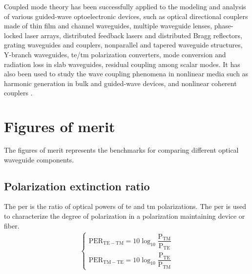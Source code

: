 \documentclass[../report.tex]{subfiles}
\begin{document}
\par 
Coupled mode theory has been successfully applied to the modeling and analysis of various guided-wave optoelectronic devices, such as optical directional couplers made of thin film and channel waveguides, multiple waveguide lenses, phase-locked laser arrays, distributed feedback lasers and distributed Bragg reflectors, grating waveguides and couplers, nonparallel and tapered waveguide structures, Y-branch waveguides, \gls{te}/\gls{tm} polarization converters, mode conversion and radiation loss in slab waveguides, residual coupling among scalar modes. It has also been used to study the wave coupling phenomena in nonlinear media such as harmonic generation in bulk and guided-wave devices, and nonlinear coherent couplers \cite{haus_coupled_1991}.

\section{Figures of merit}
The figures of merit represents the benchmarks for comparing different optical waveguide components.
\begin{comment}		
\subsection{Confinement factor}
The confinement factor is a measure of the proportion of the electric field power in a given mode that lies within the core.  
\begin{equation}\label{eq:per}
\text{ Confinement factor } = \dfrac {\int _{-w / 2}^{w/2}E_{x}^{2}\left( y\right) dy} {\int _{-\infty }^{\infty }E_{x}^{2}\left( y\right) dy},
\end{equation}
where, $w$ is the width of the waveguide core. Confinement factor is an important measure which is function of various factors like polarization, \gls{ri} difference between the core and cladding, mode number etc.	
\end{comment}
\subsection{Polarization extinction ratio}
The \gls{per} is the ratio of optical powers of \gls{te} and \gls{tm} polarizations. The \gls{per} is used to characterize the degree of polarization in a polarization maintaining device or fiber. 	
\begin{equation}\label{eq:wave_sop}
\begin{aligned}
\begin{cases}
\mathrm{PER_{TE-TM}} = 10\log_{10} \dfrac {\mathrm{P_{TM}}} {\mathrm{P_{TE}}}\\
\mathrm{PER_{TM-TE}} = 10\log_{10} \dfrac {\mathrm{P_{TE}}} {\mathrm{P_{TM}}}
\end{cases}
\end{aligned}
\end{equation}
\end{document}
